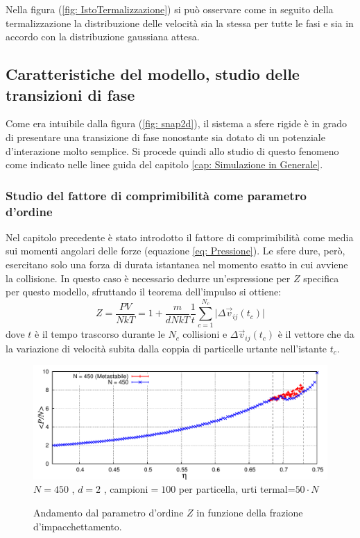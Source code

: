 \documentclass[11pt]{article}
\theoremstyle{plain}
\theoremstyle{remark}
\begin{document}
Nella figura (\ref{fig: IstoTermalizzazione}) si può osservare come in seguito della termalizzazione la distribuzione delle velocità sia la stessa per tutte le fasi e sia in accordo con la distribuzione gaussiana attesa.

\FloatBarrier
\subsection{Caratteristiche del modello, studio delle transizioni di fase}
Come era intuibile dalla figura (\ref{fig: snap2d}), il sistema a sfere rigide è in grado di presentare una transizione di fase nonostante sia dotato di un potenziale d'interazione molto semplice.
Si procede quindi allo studio di questo fenomeno come indicato nelle linee guida del capitolo \ref{cap: Simulazione in Generale}.
\subsubsection{Studio del fattore di comprimibilità come parametro d'ordine}
Nel capitolo precedente è stato introdotto il fattore di comprimibilità come media sui momenti angolari delle forze (equazione \ref{eq: Pressione}).
Le sfere dure, però, esercitano solo una forza di durata istantanea nel momento esatto in cui avviene la collisione. 
In questo caso è necessario dedurre un'espressione per $Z$ specifica per questo modello, sfruttando il teorema dell'impulso si ottiene:
\begin{equation}\label{eq: termPRigido}
Z = \dfrac{P V}{N kT} = 1 + \dfrac{m}{d N kT} \dfrac{1}{t} \sum_{c=1}^{N_c}\vert \Delta \vec{v}_{ij}(t_c) \vert 
\end{equation}
dove $t$ è il tempo trascorso durante le $N_c$ collisioni e $\Delta \vec{v}_{ij}(t_c)$ è il vettore che da la variazione di velocità subita dalla coppia di particelle urtante nell'istante $t_c$.

\begin{figure}[htbp]
\centering
\caption[Sfere Rigide$/$PvsEta\_2D.cpp]{Andamento dal parametro d'ordine $Z$ in funzione della frazione d'impacchettamento.}	\vspace{-15pt}
\includegraphics[scale=0.9]{Immagini/Rigide/PvsEta2D}
	\newline \footnotesize{$N= 450$ , $d=2$ , campioni$= 100$ per particella,  urti termal=$ 50 \cdot N$}
	\label{fig: PvsEta2D}
\end{figure}
\end{document}
